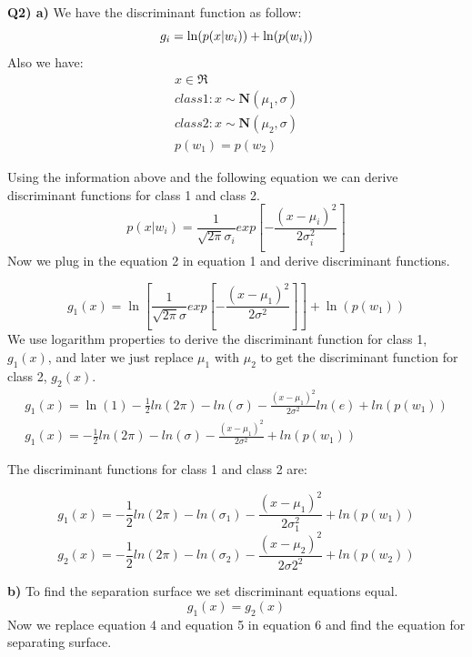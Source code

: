 \documentclass[12pt]{article}
\begin{document}
\textbf{Q2) a)} We have the discriminant function as follow:
\begin{equation} \label{disc_func}
g_{i}=\ln(p(x|w_{i})) + \ln(p(w_{i}))\\
\end{equation}
Also we have:
\begin{gather*}
x \in \Re \\ 
class1: x\sim\mathbf{N}(\mu_{1},\sigma)\\
class2: x\sim\mathbf{N}(\mu_{2},\sigma)\\
p(w_{1})=p(w_{2})
\end{gather*}

Using the information above and the following equation we can derive discriminant functions for class 1 and class 2.
\begin{equation}
p(x|w_{i})=\frac{1}{\sqrt{2\pi}\sigma_{i}}exp\left[-\frac{(x-\mu_{i})^2}{2\sigma_{i}^2} \right]
\end{equation}
Now we plug in the equation 2 in equation 1 and derive discriminant functions.

\begin{equation}
g_{1}(x)=\ln\left[\frac{1}{\sqrt{2\pi}\sigma}exp\left[-\frac{(x-\mu_{1})^2}{2\sigma^2} \right]\right] + \ln(p(w_{1}))
\end{equation}
We use logarithm properties to derive the discriminant function for class 1, $g_{1}(x)$, and later we just replace $\mu_{1}$ with $\mu_{2}$ to get the discriminant function for class 2, $g_{2}(x)$.
\begin{gather*}
	g_{1}(x)=\ln(1) -\frac{1}{2}ln(2\pi)-ln(\sigma)-\frac{(x-\mu_{1})^2}{2\sigma^2}ln(e)+ln(p(w_{1}))\\
	g_{1}(x)=-\frac{1}{2}ln(2\pi)-ln(\sigma)-\frac{(x-\mu_{1})^2}{2\sigma^2}+ln(p(w_{1}))
\end{gather*}

The discriminant functions for class 1 and class 2 are:

\begin{equation}
	g_{1}(x)=-\frac{1}{2}ln(2\pi)-ln(\sigma_{1})-\frac{(x-\mu_{1})^2}{2\sigma_{1}^2}+ln(p(w_{1}))
\end{equation}
\begin{equation}
	g_{2}(x)=-\frac{1}{2}ln(2\pi)-ln(\sigma_{2})-\frac{(x-\mu_{2})^2}{2\sigma{2}^2}+ln(p(w_{2}))
\end{equation}

\textbf{b)} To find the separation surface we set discriminant equations equal.
\begin{equation}
g_{1}(x)=g_{2}(x)
\end{equation} 
Now we replace equation 4 and equation 5 in equation 6 and find the equation for separating surface.
\end{document}
